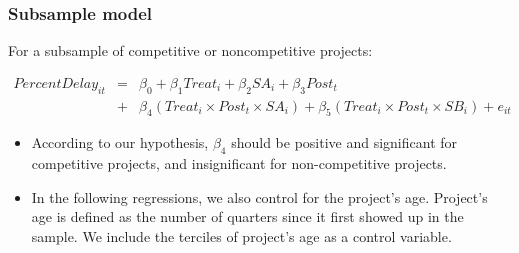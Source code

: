 \documentclass[
]{article}
\begin{document}
\hypertarget{subsample-model}{%
\subsubsection{Subsample model}\label{subsample-model}}

For a subsample of competitive or noncompetitive projects:

\[ \begin{aligned} PercentDelay_{it} &=& \beta_0 +\beta_1 Treat_i+ \beta_2 SA_i+ \beta_3 Post_t \\&+& \beta_4 (Treat_i \times Post_t \times SA_i )+\beta_5 (Treat_i \times Post_t \times SB_i )+e_{it} \end{aligned} \]

\begin{itemize}
\item
  According to our hypothesis, \(\beta_4\) should be positive and
  significant for competitive projects, and insignificant for
  non-competitive projects.
\item
  In the following regressions, we also control for the project's age.
  Project's age is defined as the number of quarters since it first
  showed up in the sample. We include the terciles of project's age as a
  control variable.
\end{itemize}
\end{document}
